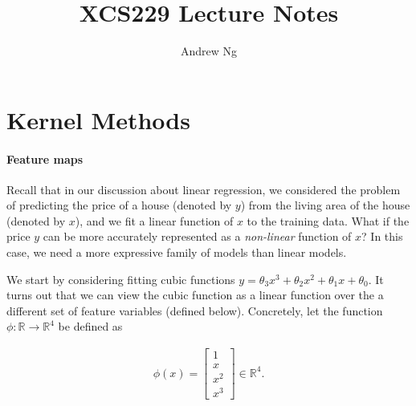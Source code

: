 \documentclass{article}
\begin{document}
\title{XCS229 Lecture Notes}
\author{Andrew Ng}
\date{}
\maketitle


\setcounter{part}{4}


\part{Kernel Methods}

\setcounter{section}{1}

\subsection{Feature maps}
Recall that in our discussion about linear regression, we considered the problem  of predicting the price of a house (denoted by $y$) from the living area of the house (denoted by $x$), and we fit a linear function of $x$ to the training data. What if the price $y$ can be more accurately represented as a \textit{non-linear} function of $x$?  In this case, we need a more expressive family of models than linear models. %

We start by considering fitting cubic functions $y = \theta_3 x^3 + \theta_2 x^2 + \theta_1 x+ \theta_0$. It turns out that we can view the cubic function as a linear function over the a different set of feature variables (defined below). Concretely, let the function $\phi:\mathbb{R}\rightarrow \mathbb{R}^4$ be defined as

\begin{align}
\phi(x) = \left[\begin{array}{c} 1\\ x \\ x^2 \\ x^3 \end{array}\right]\in \mathbb{R}^4. \label{eqn:feature-map}
\end{align}
\end{document}
